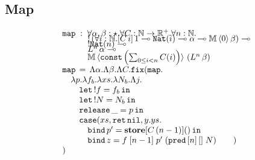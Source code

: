 
\subsection{Map}

$$
\begin{array}{l}
\texttt{map} \; : \; \forall \alpha,\beta : \star. \forall C : \N \to \R^+. \forall n : \N. \\[-2mm]
\hspace{3em} !\left(\forall i : \N. [C \, i] \, 1 \loli \texttt{Nat}(i) \loli \alpha \loli \M \, \langle 0 \rangle\,  \beta\right) \loli\\[-2mm]
\hspace{3em}  !\texttt{Nat}(n) \loli \\[-2mm]
\hspace{3em}  L^n \,\alpha \loli\\ [-2mm]
\hspace{3em}  \M \, \langle \texttt{const}\left(\sum_{0 \leq i < n} C(i)\right) \rangle\, \left(L^n \, \beta\right)\\

\texttt{map} \, = \, \Lambda \alpha. \Lambda \beta. \Lambda C. \texttt{fix}(\texttt{map}.\\
\hspace{1em} \lambda p. \lambda f_b. \lambda xs. \lambda N_b. \Lambda j.\\
\hspace{2em} \texttt{let}\, !f = f_b \, \texttt{in}\\
\hspace{2em} \texttt{let}\, !N = N_b \, \texttt{in}\\
\hspace{2em} \texttt{release} \, \_ = p \, \texttt{in}\\
\hspace{2em} \texttt{case}(xs,\texttt{ret} \, \texttt{nil},y.ys.\\
\hspace{3em} \texttt{bind} \, p' = \textbf{store}[C \, (n-1)]() \, \texttt{in}\\
\hspace{3em} \texttt{bind} \, z = f \; [n-1] \; p' \; (\texttt{pred} \, [n] \, [] \; N)
\hspace{2em})\\
)
\end{array}
$$

